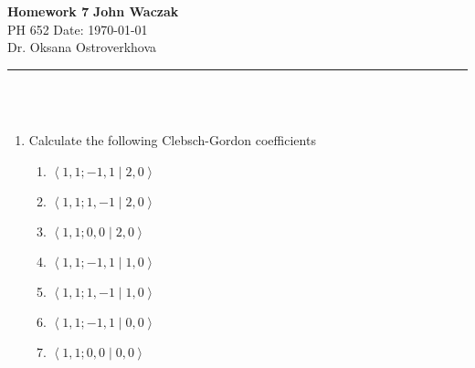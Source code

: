 \documentclass[a4paper, 11pt]{article}
\newcommand{\bracket}[2]{\ensuremath{\left\langle #1 \middle| #2 \right\rangle}}
\begin{document}
\noindent
\large\textbf{Homework 7} \hfill \textbf{John Waczak} \\
\normalsize PH 652 \hfill  Date: \today \\
Dr. Oksana Ostroverkhova
\par\noindent\rule{\textwidth}{0.4pt} \\\\



\begin{enumerate}[leftmargin=0em]
  \item Calculate the following Clebsch-Gordon coefficients
  
    \begin{enumerate}[leftmargin=3em, label=(\alph*)]
    \item $\bracket{1,1;-1,1}{2,0}$
    \item $\bracket{1,1;1,-1}{2,0}$
    \item $\bracket{1,1;0,0}{2,0}$
    \item $\bracket{1,1;-1,1}{1,0}$
    \item $\bracket{1,1;1,-1}{1,0}$
    \item $\bracket{1,1;-1,1}{0,0}$
    \item $\bracket{1,1;0,0}{0,0}$
    \end{enumerate}
    

\end{enumerate}
\end{document}
